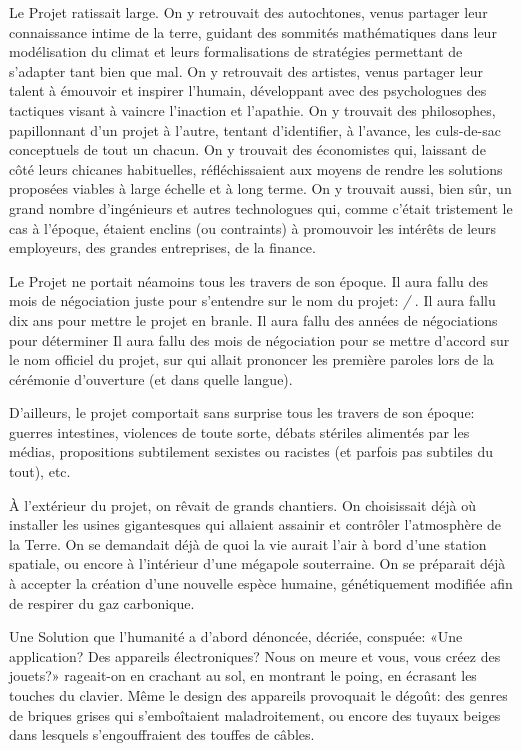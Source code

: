 Le Projet ratissait large.  
%
On y retrouvait des autochtones, venus partager
leur connaissance intime de la terre, guidant des sommités mathé\-matiques dans
leur modélisation du climat et leurs formalisations de stra\-tégies permettant
de s'adapter tant bien que mal.  On y retrouvait des artistes, venus partager
leur talent à émouvoir et inspirer l'humain, développant avec des psychologues
des tactiques visant à vaincre l'in\-act\-ion et l'apathie.  On y trouvait des
philosophes, papillonnant d'un projet à l'autre, tentant d'identifier, à
l'avance, les culs-de-sac con\-cept\-uels de tout un chacun.  On y trouvait des
économistes qui, laissant de côté leurs chicanes habituelles, réfléchissaient
aux moyens de rendre les solutions proposées viables à large échelle et à long
terme.  On y trouvait aussi, bien sûr, un grand nombre d'ingénieurs et autres
technologues qui, comme c'était trist\-ement le cas à l'époque, étaient enclins
(ou contraints) à promouvoir les intérêts de leurs employeurs, des grandes
entreprises, de la finance.

Le Projet ne portait néamoins tous les travers de son époque.  Il aura fallu
des mois de négociation juste pour s'entendre sur le nom du projet:
\textit{\nomProjet{} / \nomProjetEn{}}.  Il aura fallu dix ans pour mettre le
projet en branle.  Il aura fallu des années de négociations pour déterminer Il
aura fallu des mois de négociation pour se mettre d'accord sur le nom officiel
du projet, sur qui allait prononcer les première paroles lors de la cérémonie
d'ouverture (et dans quelle langue).

D'ailleurs, le projet \nomProjet{} comportait sans surprise tous les
travers de son époque: guerres intestines, violences de toute sorte, débats
stériles alimentés par les médias, propositions
subti\-le\-ment sexistes ou racistes (et parfois pas subtiles du tout), etc.

À l'extérieur du projet, on rêvait de grands chantiers.  On choisissait
déjà où installer les usines gigantesques qui allaient assainir et
contrô\-ler l'at\-mosphère de la Terre. On se demandait déjà de quoi la vie
aurait l'air à bord d'une station spatiale, ou encore à l'intérieur d'une
mégapole souterraine. On se préparait déjà à accepter la création d'une
nouvelle espèce humaine, génétiquement modifiée afin de respirer du gaz
carbo\-nique.


Une Solution que l'humanité a d'abord dénoncée, décriée, conspuée: «Une
application? Des appareils électroniques? Nous on meure et vous, vous créez des
jouets?» rageait-on en crachant au sol, en montrant le poing, en écrasant
les touches du clavier.  Même le design des appareils provoquait le
dégoût: des genres de briques grises qui s'emboîtaient mala\-droi\-tement, ou
encore des tuyaux beiges dans lesquels s'engouffraient des touffes
de câbles.

